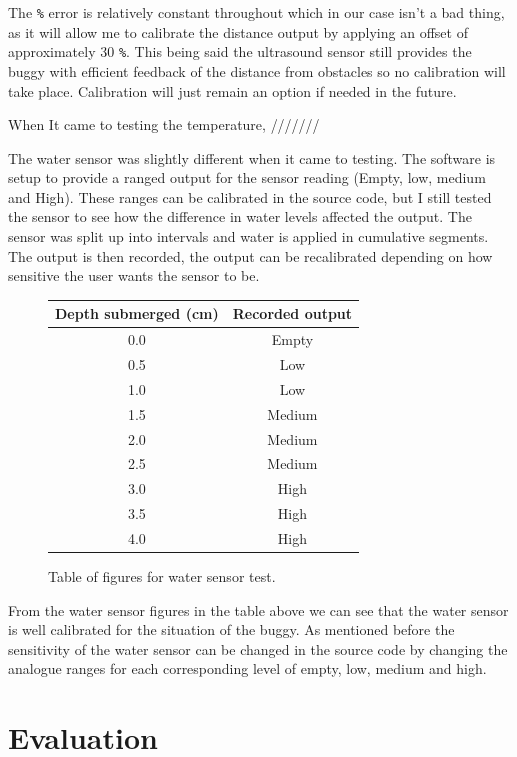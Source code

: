 \documentclass[8pt, a4paper]{article}
\begin{document}
The \verb|%| error is relatively constant throughout which in our case isn't a bad thing, as it will allow me to calibrate the distance output by applying an offset of approximately 30 \verb|%|. This being said the ultrasound sensor still provides the buggy with efficient feedback of the distance from obstacles so no calibration will take place. Calibration will just remain an option if needed in the future.  




When It came to testing the temperature, ///////

The water sensor was slightly different when it came to testing. The software is setup to provide a ranged output for the sensor reading (Empty, low, medium and High). These ranges can be calibrated in the source code, but I still tested the sensor to see how the difference in water levels affected the output. The sensor was split up into intervals and water is applied in cumulative segments. The output is then recorded, the output can be recalibrated depending on how sensitive the user wants the sensor to be. 


\begin{figure}[H]
	\centering
	\begin{tabular}{|c|c|}
		\hline
		Depth submerged (cm) & Recorded output\\
		\hline
        0.0 & Empty\\
        0.5 & Low\\
        1.0 & Low\\
        1.5 & Medium\\
        2.0 & Medium\\
        2.5 & Medium\\
        3.0 & High\\
        3.5 & High\\
        4.0 & High\\
		\hline
	\end{tabular}
	\caption{Table of figures for water sensor test.}
\end{figure}
From the water sensor figures in the table above we can see that the water sensor is well calibrated for the situation of the buggy. As mentioned before the sensitivity of the water sensor can be changed in the source code by changing the analogue ranges for each corresponding level of empty, low, medium and high. 


\section{Evaluation}
\end{document}
